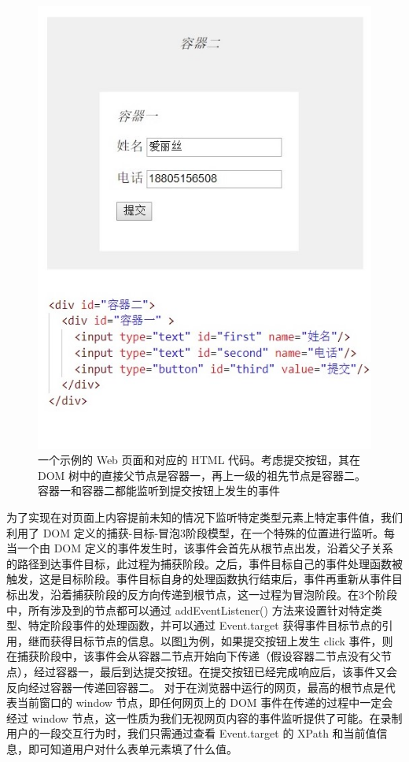 \documentclass[design, pageheader]{njubachelor}
\begin{document}
\begin{figure}
    \centering
    \includegraphics{figures/dom_case.jpg}
    \caption{一个示例的 Web 页面和对应的 HTML 代码。考虑提交按钮，其在 DOM 树中的直接父节点是容器一，再上一级的祖先节点是容器二。容器一和容器二都能监听到提交按钮上发生的事件}
    \label{fig:dom_case}
\end{figure}

为了实现在对页面上内容提前未知的情况下监听特定类型元素上特定事件值，我们利用了 DOM 定义的捕获-目标-冒泡3阶段模型，在一个特殊的位置进行监听。每当一个由 DOM 定义的事件发生时，该事件会首先从根节点出发，沿着父子关系的路径到达事件目标，此过程为捕获阶段。之后，事件目标自己的事件处理函数被触发，这是目标阶段。事件目标自身的处理函数执行结束后，事件再重新从事件目标出发，沿着捕获阶段的反方向传递到根节点，这一过程为冒泡阶段。在3个阶段中，所有涉及到的节点都可以通过 addEventListener() 方法来设置针对特定类型、特定阶段事件的处理函数，并可以通过 Event.target 获得事件目标节点的引用，继而获得目标节点的信息。以图\ref{fig:dom_case}为例，如果提交按钮上发生 click 事件，则在捕获阶段中，该事件会从容器二节点开始向下传递（假设容器二节点没有父节点），经过容器一，最后到达提交按钮。在提交按钮已经完成响应后，该事件又会反向经过容器一传递回容器二。 对于在浏览器中运行的网页，最高的根节点是代表当前窗口的 window 节点，即任何网页上的 DOM 事件在传递的过程中一定会经过 window 节点，这一性质为我们无视网页内容的事件监听提供了可能。在录制用户的一段交互行为时，我们只需通过查看 Event.target 的 XPath 和当前值信息，即可知道用户对什么表单元素填了什么值。
\end{document}
